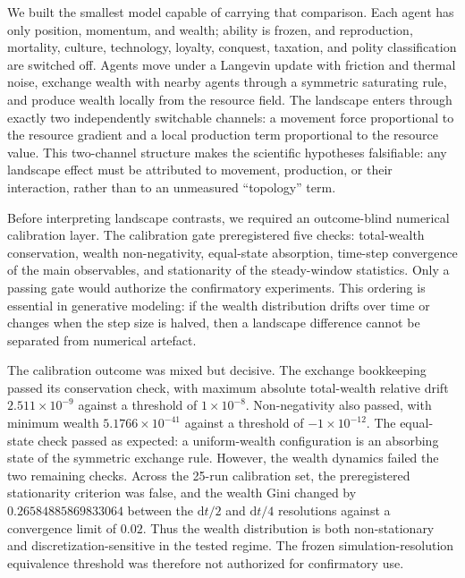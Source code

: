 \documentclass[11pt]{article}
\begin{document}
\medskip
\noindent
We built the smallest model capable of carrying that comparison. Each agent has
only position, momentum, and wealth; ability is frozen, and reproduction,
mortality, culture, technology, loyalty, conquest, taxation, and polity
classification are switched off. Agents move under a Langevin update with
friction and thermal noise, exchange wealth with nearby agents through a
symmetric saturating rule, and produce wealth locally from the resource field.
The landscape enters through exactly two independently switchable channels:
a movement force proportional to the resource gradient and a local production
term proportional to the resource value. This two-channel structure makes the
scientific hypotheses falsifiable: any landscape effect must be attributed to
movement, production, or their interaction, rather than to an unmeasured
``topology'' term.

\medskip
\noindent
Before interpreting landscape contrasts, we required an outcome-blind numerical
calibration layer. The calibration gate preregistered five checks: total-wealth
conservation, wealth non-negativity, equal-state absorption,
time-step convergence of the main observables, and stationarity of the
steady-window statistics. Only a passing gate would authorize the confirmatory
experiments. This ordering is essential in generative modeling: if the
wealth distribution drifts over time or changes when the step size is halved,
then a landscape difference cannot be separated from numerical artefact.

\medskip
\noindent
The calibration outcome was mixed but decisive. The exchange bookkeeping passed
its conservation check, with maximum absolute total-wealth relative drift
$2.511\times10^{-9}$ against a threshold of $1\times10^{-8}$. Non-negativity
also passed, with minimum wealth $5.1766\times10^{-41}$ against a threshold of
$-1\times10^{-12}$. The equal-state check passed as expected: a uniform-wealth
configuration is an absorbing state of the symmetric exchange rule. However,
the wealth dynamics failed the two remaining checks. Across the 25-run
calibration set, the preregistered stationarity criterion was false, and the
wealth Gini changed by $0.26584885869833064$ between the $\mathrm{d}t/2$ and
$\mathrm{d}t/4$ resolutions against a convergence limit of $0.02$. Thus the
wealth distribution is both non-stationary and discretization-sensitive in the
tested regime. The frozen simulation-resolution equivalence threshold was
therefore not authorized for confirmatory use.
\end{document}
